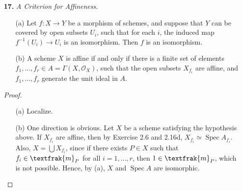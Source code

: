 \documentclass{article}
\newcommand{\goth}[1]{\textfrak{#1}}
\newcommand{\fO}{\mathscr{O}}
\DeclareMathOperator{\spec}{Spec}
\begin{document}
\begin{enumerate} [label=\textbf{\arabic*.}, leftmargin=0em]
\begin{proof}
\begin{itemize} [leftmargin=0cm]
        \item[(c)] Let $X = \bigcup_{i = 1}^n U_i$, where $U_i = \spec{A_i}$, and let $X_{f, i} = X_f \cap U_i$. Assume $X_{f, i} \neq \emptyset$. We first show that for some $n_i > 0$, $f^{n_i} b_i$ is the restriction of an element of $\Gamma(U_i, \fO_X) = A_i$, where $b_i$ is the image of $b$ in $\Gamma(X_{f, i}, \fO_X)$. It is not hard to see that $\Gamma(X_{f, i}, \fO_X) = (A_i)_f$, so $b_i = b_i' / f^{n_i}$ for some $b_i' \in A_i$ and $n_i > 0$ (the case is trivial when $n_i = 0$), thus $f^{n_i} b_i$ is an element of $A_i$. Let $n = \max{\{n_i\}}$, then $f^n b_i$ is an element of $A_i$ for all $i$, and for all $i \neq j$, $f^n b_i$ and $f^n b_j$ restrict to the same element on $U_i \cap U_j$, so by part (b), there exists $n_{i, j} > 0$ such that $f^{n_{i, j}}(f^nb_i - f^n b_j) = 0$. Again, let $m = \max\{ n_{i, j} \}$, then $f^{m + n} b$ is the restriction of an element of $A$.

        \item[(d)] The element $f$ is clearly invertible in $\Gamma(X_f, \fO_X)$, so by part (c), every element of $\Gamma(X_f, \fO_X)$ is of the form $a / f^n$ for some $a \in A$ and $n \geq 0$.
    \end{itemize}
\end{proof}

\item[\textbf{17.}] \textit{A Criterion for Affineness.}
\begin{itemize}
    \item[(a)] Let $f : X \to Y$ be a morphism of schemes, and suppose that $Y$ can be covered by open subsets $U_i$, such that for each $i$, the induced map $f^{-1}(U_i) \to U_i$ is an isomorphism. Then $f$ is an isomorphism.
    \item[(b)] A scheme $X$ is affine if and only if there is a finite set of elements $f_1, \dots, f_r \in A = \Gamma(X, \fO_X)$, such that the open subsets $X_{f_i}$ are affine, and $f_1, \dots, f_r$ generate the unit ideal in $A$.
\end{itemize}

\begin{proof} $ $ \vspace{0pt}
   \begin{itemize} [leftmargin=0cm]
    \item[(a)] Localize.

    \item[(b)] One direction is obvious. Let $X$ be a scheme satisfying the hypothesis above. If $X_{f_i}$ are affine, then by Exercise 2.6 and 2.16d, $X_{f_i} \simeq \spec{A_{f_i}}$. Also, $X = \bigcup X_{f_i}$, since if there exists $P \in X$ such that $f_i \in \goth{m}_P$ for all $i = 1, \dots, r$, then $1 \in \goth{m}_P$, which is not possible. Hence, by (a), $X$ and $\spec{A}$ are isomorphic.
   \end{itemize}
\end{proof}


\end{enumerate}
\end{document}
